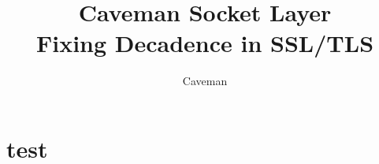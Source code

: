 \documentclass{article}
\author{Caveman}
\title{Caveman Socket Layer\\
{\large Fixing Decadence in SSL/TLS}}
\begin{document}
\maketitle
\section{test}
\end{document}
